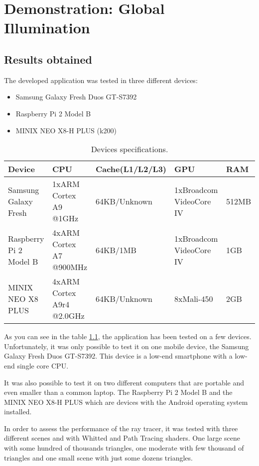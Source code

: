 \chapter{Demonstration: Global Illumination}

\section{Results obtained}
\label{ResultsObtained}

\par
The developed application was tested in three different devices:

\begin{itemize}
	\item Samsung Galaxy Fresh Duos GT-S7392
	\item Raspberry Pi 2 Model B
	\item MINIX NEO X8-H PLUS (k200)
\end{itemize}

\begin{table}[H]
	\small
	\centering
	\caption{Devices specifications.}
	\label{specs}
	\hspace*{-2cm}
	\begin{tabular}{|l|l|l|l|l|}
		\hline
		Device&CPU&Cache(L1/L2/L3)&GPU&RAM\\ \hline
		Samsung Galaxy Fresh&1xARM Cortex A9 @1GHz&64KB/Unknown&1xBroadcom VideoCore IV&512MB\\ \hline
		Raspberry Pi 2 Model B&4xARM Cortex A7 @900MHz&64KB/1MB&1xBroadcom VideoCore IV&1GB\\ \hline
		MINIX NEO X8 PLUS&4xARM Cortex A9r4 @2.0GHz&64KB/Unknown&8xMali-450&2GB\\ \hline
	\end{tabular}
\end{table}

\par
As you can see in the table \ref{specs}, the application has been tested on a few devices.
Unfortunately, it was only possible to test it on one mobile device, the Samsung Galaxy Fresh Duos GT-S7392.
This device is a low-end smartphone with a low-end single core CPU.

\par
It was also possible to test it on two different computers that are portable and even smaller than a common laptop.
The Raspberry Pi 2 Model B and the MINIX NEO X8-H PLUS which are devices with the Android operating system installed.

\par
In order to assess the performance of the ray tracer, it was tested with three different scenes and with Whitted and Path Tracing shaders.
One large scene with some hundred of thousands triangles, one moderate with few thousand of triangles and one small scene with just some dozens triangles.


